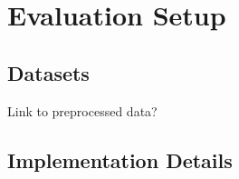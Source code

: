 \chapter{Evaluation Setup}

\section{Datasets}

{\color{red} Link to preprocessed data?}

\section{Implementation Details}